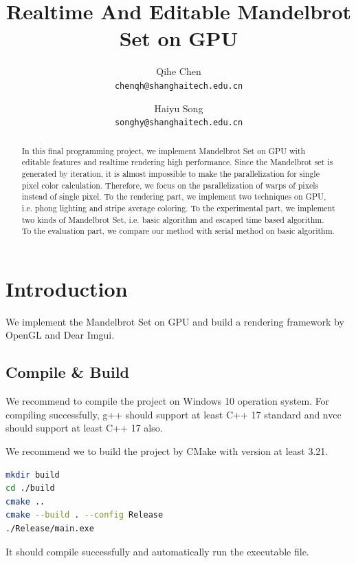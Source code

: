 \documentclass{article}
\title{Realtime And Editable Mandelbrot Set on GPU}
\author{Qihe Chen\\
{\tt\small chenqh@shanghaitech.edu.cn}
\and
Haiyu Song\\
{\tt\small songhy@shanghaitech.edu.cn}
}
\begin{document}
\maketitle

\begin{abstract}
    In this final programming project, we implement Mandelbrot Set on GPU with editable features and realtime rendering high performance. Since the Mandelbrot set is generated by iteration, it is almost impossible to make the parallelization for single pixel color calculation. Therefore, we focus on the parallelization of warps of pixels instead of single pixel. To the rendering part, we implement two techniques on GPU, i.e. phong lighting and stripe average coloring. To the experimental part, we implement two kinds of Mandelbrot Set, i.e. basic algorithm and escaped time based algorithm. To the evaluation part, we compare our method with serial method on basic algorithm.
\end{abstract}

\section{Introduction}
    We implement the Mandelbrot Set on GPU and build a rendering framework by OpenGL and Dear Imgui.
    \subsection{Compile \& Build}
        We recommend to compile the project on Windows 10 operation system. For compiling successfully, g++ should support at least C++ 17 standard and nvcc should support at least C++ 17 also.
        
        We recommend we to build the project by CMake with version at least 3.21.

\begin{lstlisting}[language=bash]
mkdir build
cd ./build
cmake ..
cmake --build . --config Release
./Release/main.exe
\end{lstlisting}

     It should compile successfully and automatically run the executable file.
\end{document}
